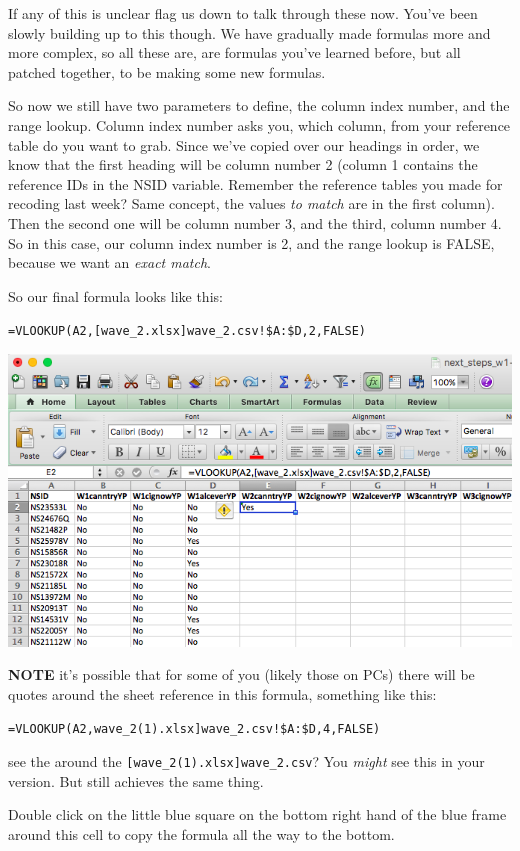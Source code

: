 \documentclass[]{book}
\theoremstyle{definition}
\theoremstyle{definition}
\theoremstyle{definition}
\theoremstyle{remark}
\begin{document}
If any of this is unclear flag us down to talk through these now. You've
been slowly building up to this though. We have gradually made formulas
more and more complex, so all these are, are formulas you've learned
before, but all patched together, to be making some new formulas.

So now we still have two parameters to define, the column index number,
and the range lookup. Column index number asks you, which column, from
your reference table do you want to grab. Since we've copied over our
headings in order, we know that the first heading will be column number
2 (column 1 contains the reference IDs in the NSID variable. Remember
the reference tables you made for recoding last week? Same concept, the
values \emph{to match} are in the first column). Then the second one
will be column number 3, and the third, column number 4. So in this
case, our column index number is 2, and the range lookup is FALSE,
because we want an \emph{exact match}.

So our final formula looks like this:

\texttt{=VLOOKUP(A2,{[}wave\_2.xlsx{]}wave\_2.csv!\$A:\$D,2,FALSE)}

\includegraphics{imgs/merge_first_form.png}

\textbf{NOTE} it's possible that for some of you (likely those on PCs)
there will be quotes around the sheet reference in this formula,
something like this:

\texttt{=VLOOKUP(A2,\textquotesingle{}{[}wave\_2(1).xlsx{]}wave\_2.csv\textquotesingle{}!\$A:\$D,4,FALSE)}

see the \texttt{\textquotesingle{}} around the
\texttt{{[}wave\_2(1).xlsx{]}wave\_2.csv}? You \emph{might} see this in
your version. But still achieves the same thing.

Double click on the little blue square on the bottom right hand of the
blue frame around this cell to copy the formula all the way to the
bottom.
\end{document}
